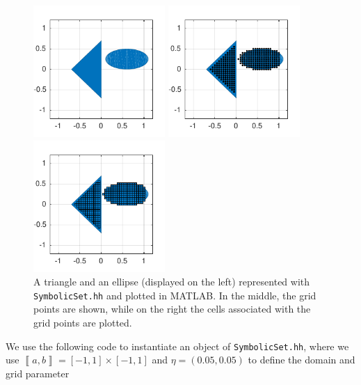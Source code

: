 \documentclass[a4paper]{amsart}
\newcommand{\segcc}[1]{\ensuremath{{\left\llbracket#1\right\rrbracket}}}
\newcommand{\intcc}[1]{\ensuremath{{\left[#1\right]}}}
\begin{document}
\begin{figure}[h]
\centering
\begin{minipage}{0.33\textwidth}
  \includegraphics[width=5cm]{figures/rectangle}
\end{minipage}%
\begin{minipage}{0.33\textwidth}
  \includegraphics[width=5cm]{figures/rectangle2}
\end{minipage}%
\begin{minipage}{0.33\textwidth}
  \includegraphics[width=5cm]{figures/rectangle3}
\end{minipage}
\caption{A triangle and an ellipse (displayed on the left) represented with
  {{\tt\small SymbolicSet.hh}} and plotted in MATLAB. In the middle, the grid points are shown,
while on the right the cells associated with the grid points are plotted.}\label{f:symbolicset}
\end{figure}
We use the following code to instantiate an object of {\tt SymbolicSet.hh},
where we use $\segcc{a,b}=\intcc{-1,1}\times\intcc{-1,1}$ and $\eta=(0.05,0.05)$
to define the domain and grid parameter
\end{document}
